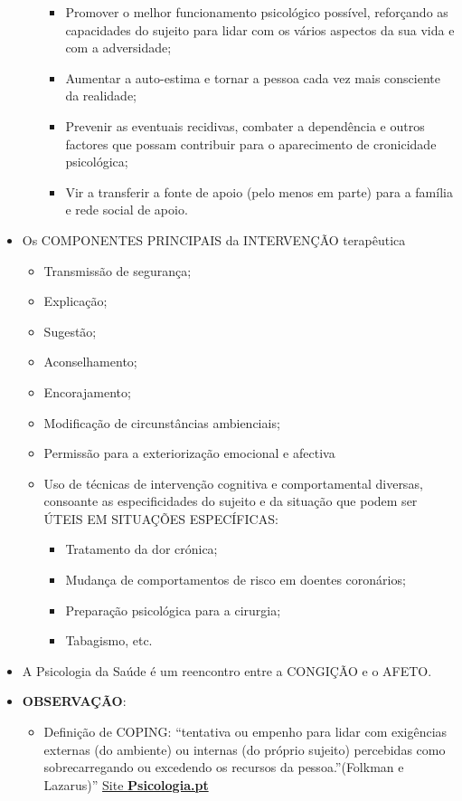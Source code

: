 \documentclass[
]{book}
\providecommand{\tightlist}{%
  \setlength{\itemsep}{0pt}\setlength{\parskip}{0pt}}
\begin{document}
\begin{itemize}
\begin{itemize}
    \begin{itemize}
    \tightlist
    \item
      Promover o melhor funcionamento psicológico possível, reforçando as capacidades do sujeito para lidar com os vários aspectos da sua vida e com a adversidade;
    \item
      Aumentar a auto-estima e tornar a pessoa cada vez mais consciente da realidade;
    \item
      Prevenir as eventuais recidivas, combater a dependência e outros factores que possam contribuir para o aparecimento de cronicidade psicológica;
    \item
      Vir a transferir a fonte de apoio (pelo menos em parte) para a família e rede social de apoio.
    \end{itemize}
  \end{itemize}
\item
  Os COMPONENTES PRINCIPAIS da INTERVENÇÃO terapêutica

  \begin{itemize}
  \tightlist
  \item
    Transmissão de segurança;
  \item
    Explicação;
  \item
    Sugestão;
  \item
    Aconselhamento;
  \item
    Encorajamento;
  \item
    Modificação de circunstâncias ambienciais;
  \item
    Permissão para a exteriorização emocional e afectiva
  \item
    Uso de técnicas de intervenção cognitiva e comportamental diversas, consoante as especificidades do sujeito e da situação que podem ser ÚTEIS EM SITUAÇÕES ESPECÍFICAS:

    \begin{itemize}
    \tightlist
    \item
      Tratamento da dor crónica;
    \item
      Mudança de comportamentos de risco em doentes coronários;
    \item
      Preparação psicológica para a cirurgia;
    \item
      Tabagismo, etc.
    \end{itemize}
  \end{itemize}
\item
  A Psicologia da Saúde é um reencontro entre a CONGIÇÃO e o AFETO.
\item
  \textbf{OBSERVAÇÃO}:

  \begin{itemize}
  \tightlist
  \item
    Definição de COPING: ``tentativa ou empenho para lidar com exigências externas (do ambiente) ou internas (do próprio sujeito) percebidas como sobrecarregando ou excedendo os recursos da pessoa.''(Folkman e Lazarus)'' \href{https://www.psicologia.pt/artigos/ver_opiniao.php?codigo=AOP0216}{Site \textbf{Psicologia.pt}}
  \end{itemize}
\end{itemize}
\end{document}
